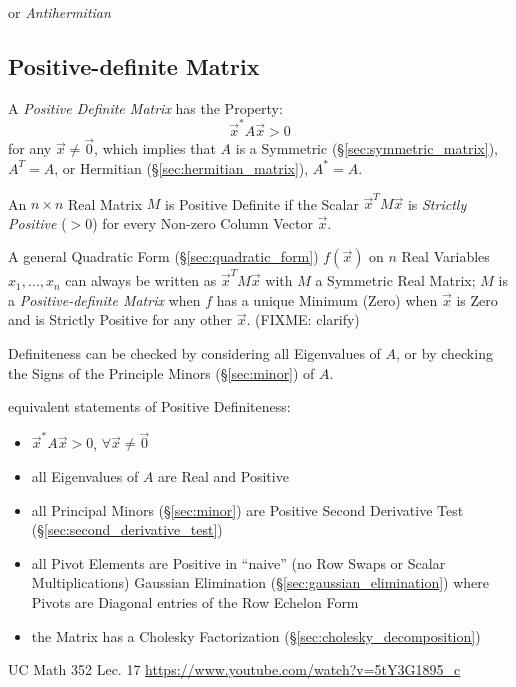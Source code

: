 or \emph{Antihermitian}



\subsection{Positive-definite Matrix}\label{sec:positive_definite}

A \emph{Positive Definite Matrix} has the Property:
\[
  \vec{x}^* A \vec{x} > 0
\]
for any $\vec{x} \neq \vec{0}$, which implies that $A$ is a Symmetric
(\S\ref{sec:symmetric_matrix}), $A^T = A$, or Hermitian
(\S\ref{sec:hermitian_matrix}), $A^* = A$.

An $n \times n$ Real Matrix $M$ is Positive Definite if the Scalar
$\vec{x}^TM\vec{x}$ is \emph{Strictly Positive} ($>0$) for every Non-zero
Column Vector $\vec{x}$.

A general Quadratic Form (\S\ref{sec:quadratic_form}) $f(\vec{x})$ on $n$ Real
Variables $x_1,\ldots,x_n$ can always be written as $\vec{x}^T M \vec{x}$ with
$M$ a Symmetric Real Matrix; $M$ is a \emph{Positive-definite Matrix} when $f$
has a unique Minimum (Zero) when $\vec{x}$ is Zero and is Strictly Positive for
any other $\vec{x}$. (FIXME: clarify)

Definiteness can be checked by considering all Eigenvalues of $A$, or by
checking the Signs of the Principle Minors (\S\ref{sec:minor}) of $A$.

equivalent statements of Positive Definiteness:
\begin{itemize}
  \item $\vec{x}^*A\vec{x} > 0$, $\forall \vec{x} \neq \vec{0}$
  \item all Eigenvalues of $A$ are Real and Positive
  \item all Principal Minors (\S\ref{sec:minor}) are Positive \fist Second
    Derivative Test (\S\ref{sec:second_derivative_test})
  \item all Pivot Elements are Positive in ``naive'' (no Row Swaps or Scalar
    Multiplications) Gaussian Elimination (\S\ref{sec:gaussian_elimination})
    where Pivots are Diagonal entries of the Row Echelon Form
  \item the Matrix has a Cholesky Factorization
    (\S\ref{sec:cholesky_decomposition})
\end{itemize}

UC Math 352 Lec. 17 \url{https://www.youtube.com/watch?v=5tY3G1895_c}

